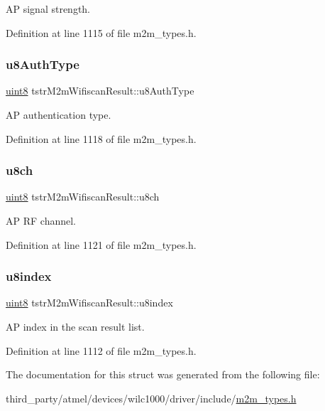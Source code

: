 AP signal strength. 

Definition at line 1115 of file m2m\+\_\+types.\+h.

\mbox{\label{structtstrM2mWifiscanResult_a0b9dbf6b40e1def154c89c53a7ceb381}} 
\subsubsection{\texorpdfstring{u8\+Auth\+Type}{u8AuthType}}
{\footnotesize\ttfamily \hyperlink{group__DataT_ga4df709a77647e870bbf1d955b8edc9a6}{uint8} tstr\+M2m\+Wifiscan\+Result\+::u8\+Auth\+Type}

AP authentication type. 

Definition at line 1118 of file m2m\+\_\+types.\+h.

\mbox{\label{structtstrM2mWifiscanResult_a345089f7fa5a6570886c340c08cfeb2e}} 
\subsubsection{\texorpdfstring{u8ch}{u8ch}}
{\footnotesize\ttfamily \hyperlink{group__DataT_ga4df709a77647e870bbf1d955b8edc9a6}{uint8} tstr\+M2m\+Wifiscan\+Result\+::u8ch}

AP RF channel. 

Definition at line 1121 of file m2m\+\_\+types.\+h.

\mbox{\label{structtstrM2mWifiscanResult_a70c6b917a7693e2afcc8e912e10f1d96}} 
\subsubsection{\texorpdfstring{u8index}{u8index}}
{\footnotesize\ttfamily \hyperlink{group__DataT_ga4df709a77647e870bbf1d955b8edc9a6}{uint8} tstr\+M2m\+Wifiscan\+Result\+::u8index}

AP index in the scan result list. 

Definition at line 1112 of file m2m\+\_\+types.\+h.



The documentation for this struct was generated from the following file\+:\begin{DoxyCompactItemize}
\item 
third\+\_\+party/atmel/devices/wilc1000/driver/include/\hyperlink{m2m__types_8h}{m2m\+\_\+types.\+h}\end{DoxyCompactItemize}
